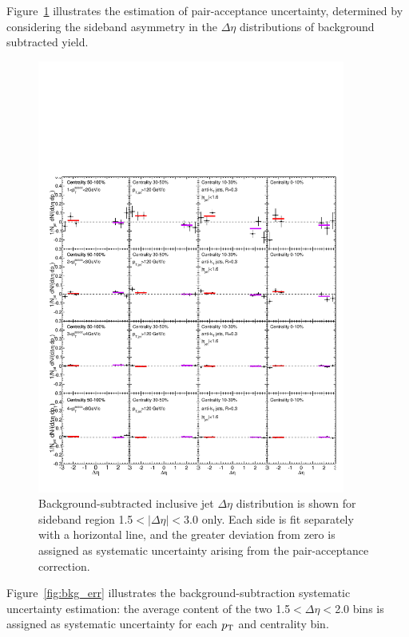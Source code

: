 \label{app:err_me_bkg}


Figure~\ref{fig:me_err} illustrates the estimation of pair-acceptance uncertainty, determined by considering the sideband asymmetry in the $\Delta\eta$ distributions of background subtracted yield.  

\begin{figure}[h!]
\begin{center}
\includegraphics[width=0.9\textwidth]{figures/Appendices/Eta_EdgeFit_PbPb_Inclusive.pdf}
\caption[Pair acceptance uncertainty determination]{Background-subtracted inclusive jet $\Delta\eta$ distribution is shown for sideband region 1.5$<|\Delta\eta|<$3.0 only.  Each side is fit separately with a horizontal line, and the greater deviation from zero is assigned as systematic uncertainty arising from the pair-acceptance correction.}
\label{fig:me_err}
\end{center}
\end{figure}

\clearpage


\noindent Figure~\ref{fig:bkg_err} illustrates the background-subtraction systematic uncertainty estimation:  the average content of the two 1.5$<\Delta\eta<$2.0 bins is assigned as systematic uncertainty for each $p_{\rm T}$ and centrality bin.  

